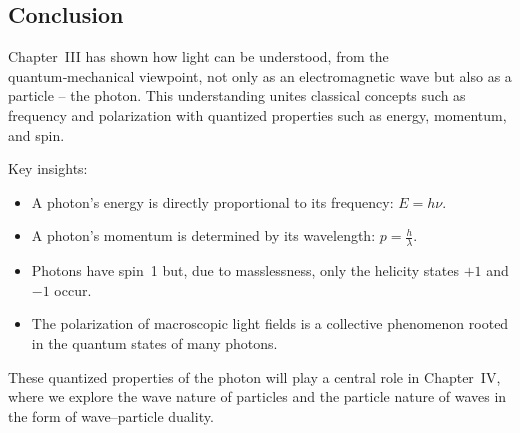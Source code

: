 \subsection{Conclusion }

Chapter~III has shown how light can be understood, from the quantum‑mechanical viewpoint, not only as an electromagnetic wave but also as a particle – the photon. This understanding unites classical concepts such as frequency and polarization with quantized properties such as energy, momentum, and spin.

\vspace{0.5em}
Key insights:
\begin{itemize}
	\item A photon’s energy is directly proportional to its frequency: \( E = h\nu \).
	\item A photon’s momentum is determined by its wavelength: \( p = \tfrac{h}{\lambda} \).
	\item Photons have spin~1 but, due to masslessness, only the helicity states $+1$ and $-1$ occur.
	\item The polarization of macroscopic light fields is a collective phenomenon rooted in the quantum states of many photons.
\end{itemize}

\vspace{0.5em}
These quantized properties of the photon will play a central role in Chapter~IV, where we explore the wave nature of particles and the particle nature of waves in the form of wave–particle duality.
